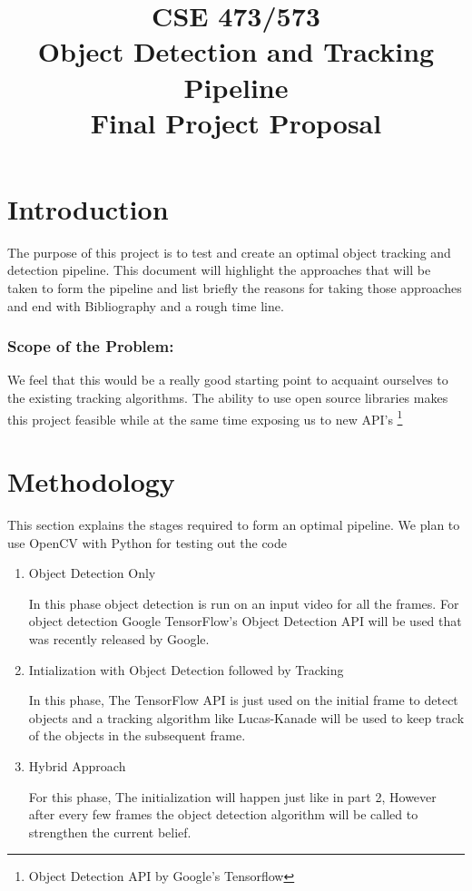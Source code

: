 \documentclass[a4paper,man,natbib]{apa6}
\title{CSE 473/573\protect \\Object Detection and Tracking Pipeline\protect \\Final Project Proposal}
\date{}
\begin{document}
\maketitle

\section{Introduction}

The purpose of this project is to test and create an optimal object tracking and detection pipeline. This document will highlight the approaches that will be taken to form the pipeline and list briefly the reasons for taking those approaches and end with Bibliography and a rough time line.
\subsubsection{Scope of the Problem:}
We feel that this would be a really good starting point to acquaint ourselves to the existing tracking algorithms. The ability to use open source libraries makes this project feasible while at the same time exposing us to new  API's \footnote{Object Detection API by Google's Tensorflow} 

\section{Methodology}
\label{sec:examples}
This section explains the stages required to form an optimal pipeline. We plan to use OpenCV with Python for testing out the code
\begin{enumerate}
\item{Object Detection Only}

In this phase object detection is run on an input video for all the frames. For object detection Google TensorFlow's Object Detection API will be used that was recently released by Google. 

\item{Intialization with Object Detection followed by Tracking}

In this phase, The TensorFlow API is just used on the initial frame to detect objects and a tracking algorithm like Lucas-Kanade will be used to keep track of the objects in the subsequent frame.
\pagebreak
\item{Hybrid Approach}

For this phase, The initialization will happen just like in part 2, However after every few frames the object detection algorithm will be called to strengthen the current belief.
\end{enumerate}  
\end{document}
